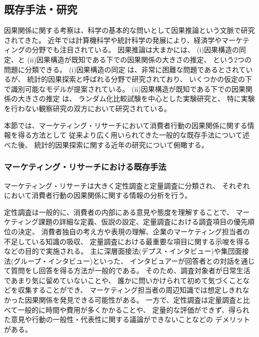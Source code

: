 
\subsection{既存手法・研究}

因果関係に関する考察は、科学の基本的な問いとして因果推論という文脈で研究されてきた。
近年では計算機科学や統計科学の発展により、経済学やマーケティングの分野でも注目されている\cite{Varian2016-se}。
因果推論は大まかには、
(i)因果構造の同定、と
(ii)因果構造が既知である下での因果関係の大きさの推定、
という2つの問題に分類できる。
(i)因果構造の同定 は、非常に困難な問題であるとされているが、
統計的因果探索と呼ばれる分野で研究されており、
いくつかの仮定の下で識別可能なモデルが提案されている\cite{2017-zx}。
(ii)因果構造が既知である下での因果関係の大きさの推定 は、
ランダム化比較試験を中心とした実験研究と、
特に実験を行わない観察研究の双方において研究されている。

本節では、マーケティング・リサーチにおいて消費者行動の因果関係に関する情報を得る方法として
従来より広く用いられてきた一般的な既存手法について述べた後、
統計的因果探索に関する近年の研究について俯瞰する。

\subsubsection{マーケティング・リサーチにおける既存手法}

マーケティング・リサーチは大きく定性調査と定量調査に分類され、
それぞれにおいて消費者行動の因果関係に関する情報の分析を行う。

定性調査は一般的に、消費者の内部にある意見や態度を理解することで、
マーケティング課題の詳細な定義、仮説の設定、定量調査における調査項目の優先順位の決定、
消費者独自の考え方や表現の理解、企業のマーケティング担当者の不足している知識の吸収、
定量調査における最重要な項目に関する示唆を得るなどの目的で実施される\cite{2018-ci}。
主に深層面接法(デプス・インタビュー)や集団面接法(グループ・インタビュー)といった、
インタビュアーが回答者との対話を通じて質問をし回答を得る方法が一般的である。
そのため、調査対象者が日常生活であまり気に留めていないことや、
誰かに問いかけられて初めて気づくことなどを収集することができ\cite{2018-ci}、
マーケティング担当者の周辺知識では想定しきれなかった因果関係を発見できる可能性がある。
一方で、定性調査は定量調査と比べて一般的に時間や費用が多くかかることや、
定量的な評価ができず、得られた意見や行動の一般性・代表性に関する議論ができないことなどの
デメリットがある。


